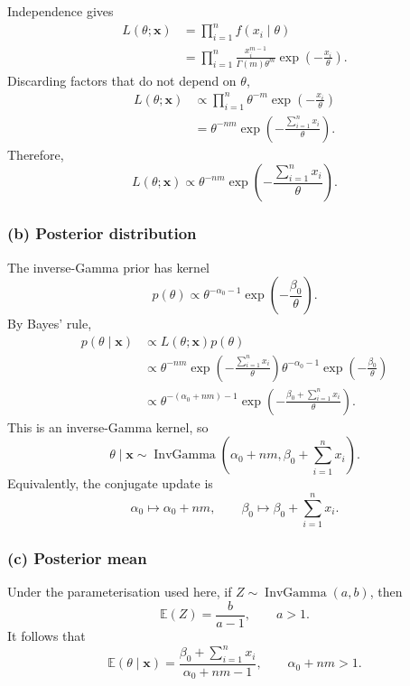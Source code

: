 \documentclass[11pt,a4paper]{article}
\newcommand{\given}{\mathrel{|}}
\newcommand{\xvec}{\boldsymbol{x}}
\DeclareMathOperator{\InvGamma}{InvGamma}
\newcommand{\E}{\mathbb{E}}
\begin{document}
Independence gives
\begin{align*}
  L(\theta;\xvec)
  &=\prod_{i=1}^n f(x_i\given\theta)\\
  &=\prod_{i=1}^n
    \frac{x_i^{m-1}}{\Gamma(m)\theta^m}
    \exp\left(-\frac{x_i}{\theta}\right).
\end{align*}
Discarding factors that do not depend on $\theta$,
\begin{align*}
  L(\theta;\xvec)
  &\propto
    \prod_{i=1}^n
    \theta^{-m}\exp\left(-\frac{x_i}{\theta}\right)\\
  &=\theta^{-nm}
    \exp\left(-\frac{\sum_{i=1}^n x_i}{\theta}\right).
\end{align*}
Therefore,
\[
  \boxed{
    L(\theta;\xvec)
    \propto
    \theta^{-nm}
    \exp\left(-\frac{\sum_{i=1}^n x_i}{\theta}\right)
  }.
\]

\subsubsection*{(b) Posterior distribution}

The inverse-Gamma prior has kernel
\[
  p(\theta)
  \propto
  \theta^{-\alpha_0-1}
  \exp\left(-\frac{\beta_0}{\theta}\right).
\]
By Bayes' rule,
\begin{align*}
  p(\theta\given\xvec)
  &\propto L(\theta;\xvec)p(\theta)\\
  &\propto
    \theta^{-nm}
    \exp\left(-\frac{\sum_{i=1}^n x_i}{\theta}\right)
    \theta^{-\alpha_0-1}
    \exp\left(-\frac{\beta_0}{\theta}\right)\\
  &\propto
    \theta^{-(\alpha_0+nm)-1}
    \exp\left(
      -\frac{\beta_0+\sum_{i=1}^n x_i}{\theta}
    \right).
\end{align*}
This is an inverse-Gamma kernel, so
\[
  \boxed{
    \theta\given\xvec
    \sim
    \InvGamma\left(
      \alpha_0+nm,
      \beta_0+\sum_{i=1}^n x_i
    \right)
  }.
\]
Equivalently, the conjugate update is
\[
  \boxed{
    \alpha_0\longmapsto\alpha_0+nm,
    \qquad
    \beta_0\longmapsto\beta_0+\sum_{i=1}^n x_i
  }.
\]

\subsubsection*{(c) Posterior mean}

Under the parameterisation used here, if $Z\sim\InvGamma(a,b)$, then
\[
  \E(Z)=\frac{b}{a-1},
  \qquad a>1.
\]
It follows that
\[
  \boxed{
    \E(\theta\given\xvec)
    =\frac{\beta_0+\sum_{i=1}^n x_i}
           {\alpha_0+nm-1}
  },
  \qquad
  \boxed{\alpha_0+nm>1}.
\]
\end{document}
